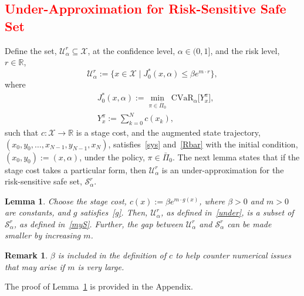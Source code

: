 \documentclass[letterpaper, 10 pt, conference]{ieeeconf}  %
\newtheorem{lemma}{Lemma}
\newtheorem{remark}{Remark}
\begin{document}
\subsection{\textcolor{red}{Under-Approximation for Risk-Sensitive Safe Set}}
Define the set, $\mathcal{U}_\alpha^r \subseteq \mathcal{X}$,
at the confidence level, $\alpha \in (0,1]$, and the risk level, $r \in \mathbb{R}$,
%
\begin{equation}\label{under}
\mathcal{U}_\alpha^r := \{x \in \mathcal{X} \mid J_0^*(x,\alpha) \leq \beta e^{m\cdot r} \},
\end{equation}
%
where
%
\begin{equation}\begin{aligned}
& J_0^*(x,\alpha) := {\underset{\pi \in \bar{\Pi}_0}\min} \text{ CVaR}_\alpha \big[ Y_x^\pi \big],\\
& Y_x^\pi := \textstyle\sum_{k=0}^N c(x_k),
\end{aligned}\label{J0}\end{equation}
%
such that $c : \mathcal{X} \to \mathbb{R}$ is a stage cost, and the augmented state trajectory, $(x_0, y_0, \dots, x_{N-1}, y_{N-1}, x_N)$,
satisfies~\eqref{sys} and~\eqref{Rbar} with the initial condition, $(x_0, y_0) := (x, \alpha)$, under the policy, $\pi \in \bar{\Pi}_0$.
The next lemma states that if the stage cost takes a particular form, then $\mathcal{U}_\alpha^r$ is an under-approximation for the risk-sensitive safe set, $\mathcal{S}_\alpha^r$.   
\begin{lemma}\label{lemma2}
Choose the stage cost, $c(x) := \beta e^{m\cdot g(x)}$, where $\beta > 0$ and $m > 0$ are constants, and $g$ satisfies~\eqref{g}.
Then, $\mathcal{U}_\alpha^r$, as defined in~\eqref{under}, is a subset of $\mathcal{S}_\alpha^r$, as defined in~\eqref{myS}. 
Further, the gap between $\mathcal{U}_\alpha^r$ and $\mathcal{S}_\alpha^r$ can be made smaller by increasing $m$.
\end{lemma}
\begin{remark} $\beta$ is included in the definition of $c$ to help counter numerical issues that may arise if $m$ is very large. \end{remark}
The proof of Lemma~\ref{lemma2} is provided in the Appendix.
%
\end{document}

